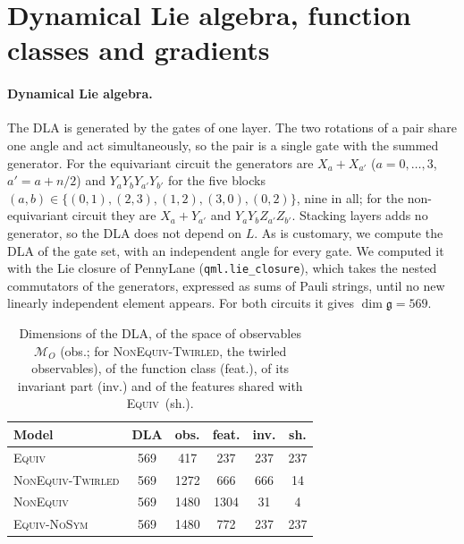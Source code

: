 \documentclass[aps,pra,reprint,superscriptaddress,longbibliography]{revtex4-2}
\newcommand{\Equiv}{\textsc{Equiv}}
\newcommand{\NonEquiv}{\textsc{NonEquiv}}
\newcommand{\Twirled}{\textsc{NonEquiv-Twirled}}
\newcommand{\NoSym}{\textsc{Equiv-NoSym}}
\begin{document}
\section{Dynamical Lie algebra, function classes and gradients}\label{app:dla}\label{app:gradients}

\paragraph{Dynamical Lie algebra.} The DLA is generated by the gates of one layer. The two rotations of a pair share one angle and act simultaneously, so the pair is a single gate with the summed generator. For the equivariant circuit the generators are $X_a+X_{a'}$ ($a=0,\dots,3$, $a'=a+n/2$) and $Y_aY_bY_{a'}Y_{b'}$ for the five blocks $(a,b)\in\{(0,1),(2,3),(1,2),(3,0),(0,2)\}$, nine in all; for the non-equivariant circuit they are $X_a+Y_{a'}$ and $Y_aY_bZ_{a'}Z_{b'}$. Stacking layers adds no generator, so the DLA does not depend on $L$. As is customary, we compute the DLA of the gate set, with an independent angle for every gate. We computed it with the Lie closure of PennyLane (\texttt{qml.lie\_closure}), which takes the nested commutators of the generators, expressed as sums of Pauli strings, until no new linearly independent element appears. For both circuits it gives $\dim\mathfrak g=569$.

\begin{table}[t]
\footnotesize
\begin{tabular*}{\columnwidth}{@{\extracolsep{\fill}}lccccc@{}}
\toprule
Model & DLA & obs. & feat. & inv. & sh.\\
\midrule
\Equiv & 569 & 417 & 237 & 237 & 237 \\
\Twirled & 569 & 1272 & 666 & 666 & 14 \\
\NonEquiv & 569 & 1480 & 1304 & 31 & 4 \\
\NoSym & 569 & 1480 & 772 & 237 & 237 \\
\bottomrule
\end{tabular*}
\caption{Dimensions of the DLA, of the space of observables $\mathcal M_O$ (obs.; for \Twirled, the twirled observables), of the function class (feat.), of its invariant part (inv.) and of the features shared with \Equiv\ (sh.).}\label{tab:dla}
\end{table}
\end{document}

